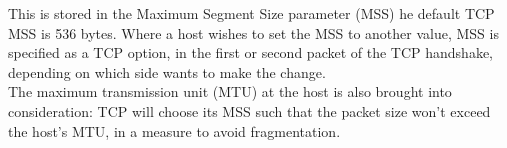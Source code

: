 This is stored in the Maximum Segment Size parameter (MSS) he default TCP MSS is 536 bytes. Where a host wishes to set the MSS to another value, MSS is specified as a TCP option, in the first or second packet of the TCP handshake, depending on which side wants to make the change. \\
The maximum transmission unit (MTU) at the host is also brought into consideration: TCP will choose its MSS such that the packet size won't exceed the host's MTU, in a measure to avoid fragmentation.